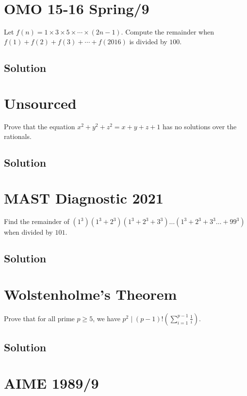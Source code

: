 \documentclass[mast]{lucky}
\begin{document}
\pagebreak\section{OMO 15-16 Spring/9}

Let $f(n)=1 \times 3 \times 5 \times \cdots \times (2n-1)$. Compute the remainder when $f(1)+f(2)+f(3)+\cdots +f(2016)$ is divided by $100.$

\subsection{Solution}

\pagebreak\section{Unsourced}

Prove that the equation $x^2+y^2+z^2=x+y+z+1$ has no solutions over the rationals.

\subsection{Solution}

\pagebreak\section{MAST Diagnostic 2021}

Find the remainder of $(1^3)(1^3+2^3)(1^3+2^3+3^3)\dots(1^3+2^3+3^3\dots+99^3)$ when divided by $101.$

\subsection{Solution}

\pagebreak\section{Wolstenholme's Theorem}

Prove that for all prime $p\ge5$, we have $p^2\mid (p-1)!\left(\sum\limits_{i=1}^{p-1}\frac1{i}\right)$.

\subsection{Solution}

\pagebreak\section{AIME 1989/9}
\end{document}
